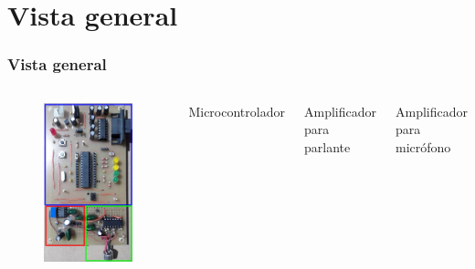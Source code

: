 \section{Vista general}
\begin{frame}
\frametitle{Vista general}
\begin{columns}[t]
\begin{figure}
\centering
\includegraphics[scale=.08]{Placa}
\end{figure}


\textcolor{azul}{Microcontrolador}

\textcolor{rojo}{Amplificador para parlante}

\textcolor{verde}{Amplificador para micrófono}
\end{columns}
\end{frame}


